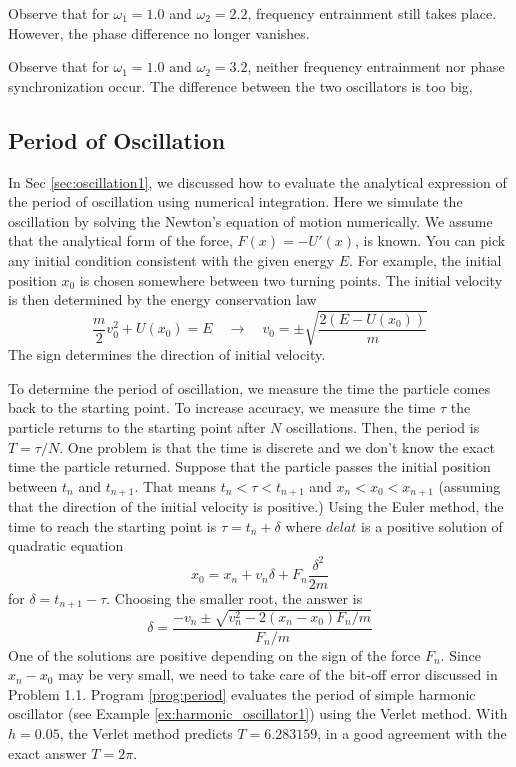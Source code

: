 \bigskip
\exercise
Observe that for $\omega_1=1.0$ and $\omega_2=2.2$, frequency entrainment still takes place.  However, the phase difference no longer vanishes.

\exercise
Observe that for $\omega_1=1.0$ and $\omega_2=3.2$, neither frequency entrainment nor phase synchronization occur.  The difference between the two oscillators is too big,


\subsection{Period of Oscillation}

In Sec \ref{sec:oscillation1}, 
we discussed how to evaluate the analytical expression of the period of oscillation using numerical integration.  Here we simulate the oscillation by solving the Newton's equation of motion numerically.  We assume that the analytical form of the force,
$F(x) = - U'(x)$, is known. You can pick any initial condition consistent with the given energy $E$. For example, the initial position $x_0$ is chosen somewhere  between two turning points. The initial velocity is then determined by the energy conservation law
%
\begin{equation}
\frac{m}{2} v_0^2 + U(x_0) = E \quad \rightarrow \quad v_0 = \pm \sqrt{\frac{2 (E-U(x_0))}{m}}
\end{equation}
%
The sign determines the direction of initial velocity.

To determine the period of oscillation, we measure the time the particle comes back to the starting point.  To increase accuracy, we measure the time $\tau$ the particle returns to the starting point after $N$ oscillations.  Then, the period is $T=\tau/N$. One problem is that the time is discrete and we don't know the exact time the particle returned.  Suppose that the particle passes the initial position between $t_n$ and $t_{n+1}$. That means $t_n < \tau <t_{n+1}$ and $x_{n} < x_0 < x_{n+1}$ (assuming that the direction of the initial velocity is positive.)  
Using the Euler method, the time to reach the starting point is $\tau = t_n + \delta$ where $delat$ is a positive solution of quadratic equation
\begin{equation}
x_0 = x_{n} + v_{n} \delta + F_{n} \frac{\delta^2}{2 m}
\end{equation}
for $\delta=t_{n+1}-\tau$.  Choosing the smaller root, the answer is
\begin{equation}
\delta = \frac{ -v_{n} \pm \sqrt{v_{n}^2 - 2 (x_n-x_0) F_{n}/m}}{F_n/m}
\end{equation}
One of the solutions are positive depending on the sign of the force $F_n$.
Since $x_n-x_0$ may be very small, we need to take care of the bit-off error discussed in Problem 1.1. 
Program \ref{prog:period} evaluates the period of simple harmonic oscillator (see Example \ref{ex:harmonic_oscillator1}) using the Verlet method. With $h=0.05$, the Verlet method predicts $T=6.283159$, in a good agreement with the exact answer $T=2\pi$. 



